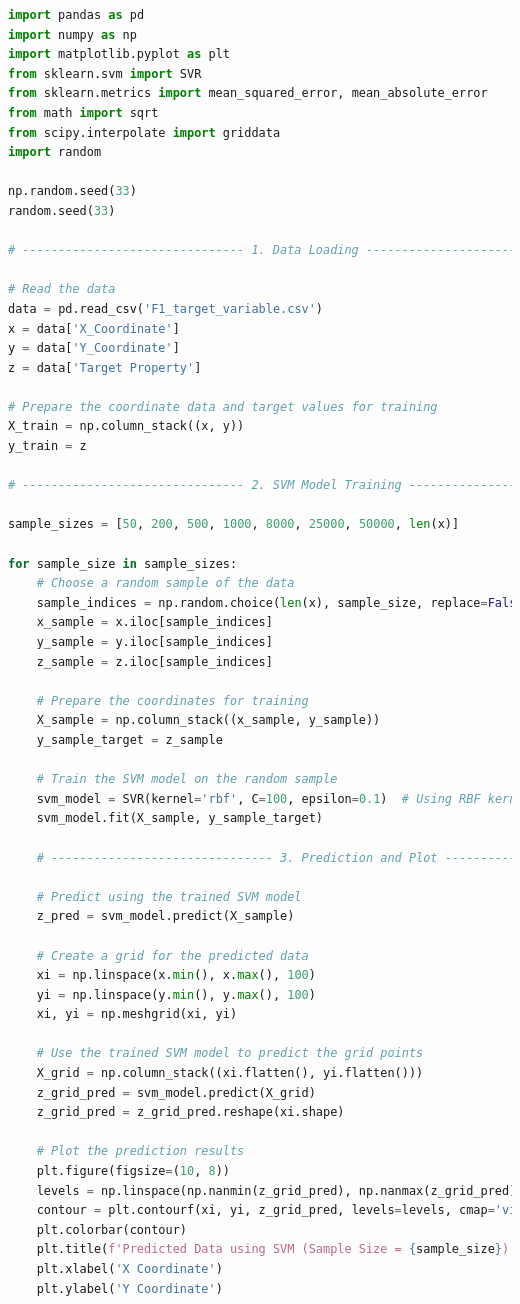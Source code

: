 \documentclass{swmcmthesis}
\begin{document}
\begin{lstlisting}[language=python,caption={The python programme for Problem 3 - Machine Learning}]
import pandas as pd
import numpy as np
import matplotlib.pyplot as plt
from sklearn.svm import SVR
from sklearn.metrics import mean_squared_error, mean_absolute_error
from math import sqrt
from scipy.interpolate import griddata
import random

np.random.seed(33)
random.seed(33)

# ------------------------------- 1. Data Loading ------------------------------- #

# Read the data
data = pd.read_csv('F1_target_variable.csv')
x = data['X_Coordinate']
y = data['Y_Coordinate']
z = data['Target Property']

# Prepare the coordinate data and target values for training
X_train = np.column_stack((x, y))
y_train = z

# ------------------------------- 2. SVM Model Training ------------------------------- #

sample_sizes = [50, 200, 500, 1000, 8000, 25000, 50000, len(x)] 

for sample_size in sample_sizes:
    # Choose a random sample of the data
    sample_indices = np.random.choice(len(x), sample_size, replace=False)
    x_sample = x.iloc[sample_indices]
    y_sample = y.iloc[sample_indices]
    z_sample = z.iloc[sample_indices]

    # Prepare the coordinates for training
    X_sample = np.column_stack((x_sample, y_sample))
    y_sample_target = z_sample

    # Train the SVM model on the random sample
    svm_model = SVR(kernel='rbf', C=100, epsilon=0.1)  # Using RBF kernel (can be tuned)
    svm_model.fit(X_sample, y_sample_target)

    # ------------------------------- 3. Prediction and Plot ------------------------------- #

    # Predict using the trained SVM model
    z_pred = svm_model.predict(X_sample)

    # Create a grid for the predicted data
    xi = np.linspace(x.min(), x.max(), 100)
    yi = np.linspace(y.min(), y.max(), 100)
    xi, yi = np.meshgrid(xi, yi)

    # Use the trained SVM model to predict the grid points
    X_grid = np.column_stack((xi.flatten(), yi.flatten()))
    z_grid_pred = svm_model.predict(X_grid)
    z_grid_pred = z_grid_pred.reshape(xi.shape)

    # Plot the prediction results
    plt.figure(figsize=(10, 8))
    levels = np.linspace(np.nanmin(z_grid_pred), np.nanmax(z_grid_pred), 20)
    contour = plt.contourf(xi, yi, z_grid_pred, levels=levels, cmap='viridis') 
    plt.colorbar(contour)
    plt.title(f'Predicted Data using SVM (Sample Size = {sample_size})')
    plt.xlabel('X Coordinate')
    plt.ylabel('Y Coordinate')


\end{lstlisting}
\end{document}
